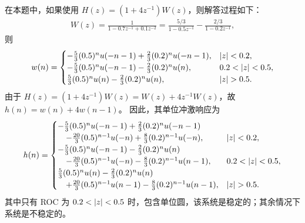 \begin{note}
    在本题中，如果使用 $H(z) = (1 + 4z^{-1})W(z)$，则解答过程如下：
    \begin{align*}
        W(z) = \frac{1}{1 - 0.7z^{-1} + 0.1z^{-2}} = \frac{5/3}{1 - 0.5z^{-1}} - \frac{2/3}{1 - 0.2z^{-1}},
    \end{align*}
    则
    \begin{align*}
        w(n) = \begin{cases}
            -\frac{5}{3}(0.5)^nu(-n - 1) + \frac{2}{3}(0.2)^nu(-n - 1), & \left|z\right| < 0.2, \\
            -\frac{5}{3}(0.5)^nu(-n - 1) - \frac{2}{3}(0.2)^nu(n), & 0.2 < \left|z\right| < 0.5, \\
            \frac{5}{3}(0.5)^nu(n) - \frac{2}{3}(0.2)^nu(n), & \left|z\right| > 0.5.
        \end{cases}
    \end{align*}
    由于 $H(z) = (1 + 4z^{-1})W(z) = W(z) + 4z^{-1}W(z)$，故 $h(n) = w(n) + 4w(n - 1)$。
    因此，其单位冲激响应为
    \begin{align*}
        h(n) = \begin{cases}
            -\frac{5}{3}(0.5)^nu(-n - 1) + \frac{2}{3}(0.2)^nu(-n - 1) \\
            \quad - \frac{20}{3}(0.5)^{n - 1}u(-n) + \frac{8}{3}(0.2)^{n - 1}u(-n), & \left|z\right| < 0.2, \\
            -\frac{5}{3}(0.5)^nu(-n - 1) - \frac{2}{3}(0.2)^nu(n) \\
            \quad - \frac{20}{3}(0.5)^{n - 1}u(-n) - \frac{8}{3}(0.2)^{n - 1}u(n - 1), & 0.2 < \left|z\right| < 0.5, \\
            \frac{5}{3}(0.5)^nu(n) - \frac{2}{3}(0.2)^nu(n) \\
            \quad + \frac{20}{3}(0.5)^{n - 1}u(n - 1) - \frac{8}{3}(0.2)^{n - 1}u(n - 1), & \left|z\right| > 0.5.
        \end{cases}
    \end{align*}
    其中只有 ROC 为 $0.2 < \left|z\right| < 0.5$ 时，包含单位圆，该系统是稳定的；其余情况下系统是不稳定的。
\end{note}
